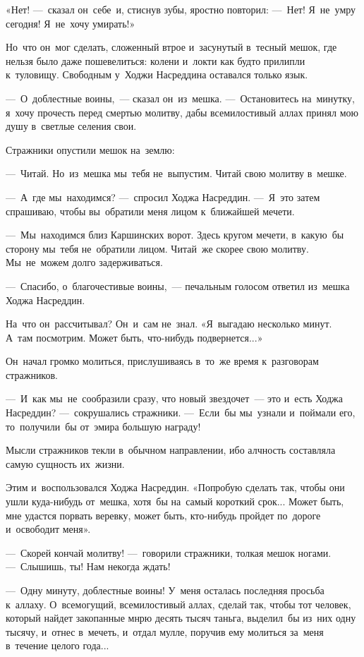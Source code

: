 \documentclass[12pt,a4paper]{book}
\begin{document}
«Нет! —~сказал он~себе~и, стиснув зубы, яростно повторил: —~Нет! Я~не~умру сегодня! Я~не~хочу умирать!»

Но~что он~мог сделать, сложенный втрое и~засунутый в~тесный мешок, где нельзя было даже пошевелиться: колени и~локти как будто прилипли к~туловищу. Свободным у~Ходжи Насреддина оставался только язык.

—~О~доблестные воины,~— сказал он~из~мешка. —~Остановитесь на~минутку, я~хочу прочесть перед смертью молитву, дабы всемилостивый аллах принял мою душу в~светлые селения свои.

Стражники опустили мешок на~землю:

—~Читай. Но~из~мешка мы~тебя не~выпустим. Читай свою молитву в~мешке.

—~А~где мы~находимся? —~спросил Ходжа Насреддин. —~Я~это затем спрашиваю, чтобы вы~обратили меня лицом к~ближайшей мечети.

—~Мы~находимся близ Каршинских ворот. Здесь кругом мечети, в~какую~бы сторону мы~тебя не~обратили лицом. Читай~же скорее свою молитву. Мы~не~можем долго задерживаться.

—~Спасибо, о~благочестивые воины,~— печальным голосом ответил из~мешка Ходжа Насреддин.

На~что он~рассчитывал? Он~и~сам не~знал. «Я~выгадаю несколько минут. А~там посмотрим. Может быть, что-нибудь подвернется...»

Он~начал громко молиться, прислушиваясь в~то~же время к~разговорам стражников.

—~И~как мы~не~сообразили сразу, что новый звездочет~— это и~есть Ходжа Насреддин? —~сокрушались стражники. —~Если~бы мы~узнали и~поймали его, то~получили~бы от~эмира большую награду!

Мысли стражников текли в~обычном направлении, ибо алчность составляла самую сущность их~жизни.

Этим и~воспользовался Ходжа Насреддин. «Попробую сделать так, чтобы они ушли куда-нибудь от~мешка, хотя~бы на~самый короткий срок... Может быть, мне удастся порвать веревку, может быть, кто-нибудь пройдет по~дороге и~освободит меня».

—~Скорей кончай молитву! —~говорили стражники, толкая мешок ногами. —~Слышишь, ты! Нам некогда ждать!

—~Одну минуту, доблестные воины! У~меня осталась последняя просьба к~аллаху. О~всемогущий, всемилостивый аллах, сделай так, чтобы тот человек, который найдет закопанные мнрю десять тысяч таньга, выделил~бы из~них одну тысячу, и~отнес в~мечеть, и~отдал мулле, поручив ему молиться за~меня в~течение целого года...
\end{document}
